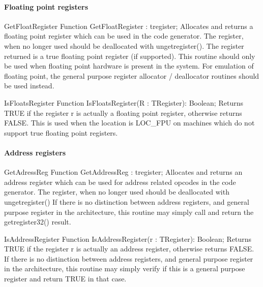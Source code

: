 \documentclass [12pt]{article}
\begin{document}
\paragraph{Floating point registers}

\begin{function}{GetFloatRegister}
\Declaration
Function GetFloatRegister : tregister;
\Description 
Allocates and returns a floating point register which can be used in the
code generator. The register, when no longer used should be deallocated with
ungetregister(). The register returned is a true floating point register (if
supported). 
\Notes 
This routine should only be used when floating point hardware is present in
the system. For emulation of floating point, the general purpose register
allocator / deallocator routines should be used instead. 
\end{function}

\begin{function}{IsFloatsRegister}
\Declaration
Function IsFloatsRegister(R : TRegister): Boolean;
\Description
Returns TRUE if the register r is actually a floating point register,
otherwise returns FALSE. This is used when the location is LOC{\_}FPU on
machines which do not support true floating point registers. 
\end{function}

\paragraph{Address registers}

\begin{function}{GetAdressReg}
\Declaration
Function GetAddressReg : tregister;
\Description 
Allocates and returns an address register which can be used for address
related opcodes in the code generator. The register, when no longer used
should be deallocated with ungetregister() 
\Notes 
If there is no distinction between address registers, and general purpose
register in the architecture, this routine may simply call and return the
getregister32() result. 
\end{function}

\begin{function}{IsAddressRegister}
\Declaration
Function IsAddressRegister(r : TRegister): Boolean;
\Description 
Returns TRUE if the register r is actually an address register, otherwise
returns FALSE.
\Notes 
If there is no distinction between address registers, and general purpose
register in the architecture, this routine may simply verify if this is a
general purpose register and return TRUE in that case. 
\end{function}
\end{document}
